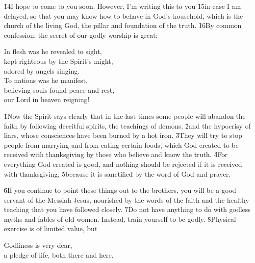 \v{14}I hope to come to you soon. However, I'm writing this to you \v{15}in case I am delayed, so that you may know how to behave in God's household, which is the church of the living God, the pillar and foundation of the truth. \v{16}By common confession, the secret of our godly worship is great:

\begin{poetry}
\poeml In flesh was he revealed to sight, \\
\poemll    kept righteous by the Spirit's might, \\
\poemlll       adored by angels singing. \\
\poeml To nations was he manifest, \\
\poemll    believing souls found peace and rest, \\
\poemlll       our Lord in heaven reigning!
\end{poetry}

\v{1}Now the Spirit says clearly that in the last times some people will abandon the faith by following deceitful spirits, the teachings of demons, \v{2}and the hypocrisy of liars, whose consciences have been burned by a hot iron. \v{3}They will try to stop people from marrying and from eating certain foods, which God created to be received with thanksgiving by those who believe and know the truth. \v{4}For everything God created is good, and nothing should be rejected if it is received with thanksgiving, \v{5}because it is sanctified by the word of God and prayer.

\v{6}If you continue to point these things out to the brothers, you will be a good servant of the Messiah Jesus, nourished by the words of the faith and the healthy teaching that you have followed closely. \v{7}Do not have anything to do with godless myths and fables of old women. Instead, train yourself to be godly. \v{8}Physical exercise is of limited value, but

\begin{poetry}
\poeml Godliness is very dear, \\
\poemll    a pledge of life, both there and here.
\end{poetry}

